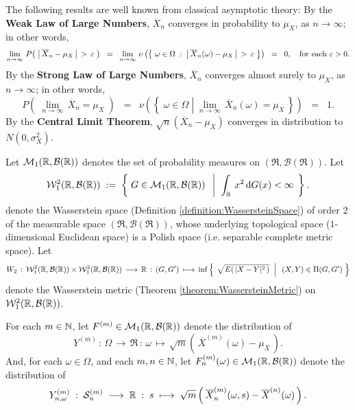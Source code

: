 \begin{remark}\quad
The following results are well known from classical asymptotic theory:
\vskip 0.1cm
\noindent
By the \textbf{Weak Law of Large Numbers}, $\overline{X}_{n}$ converges in probability to $\mu_{X}$,
as $n \longrightarrow \infty$; in other words,
\begin{equation*}
\lim_{n\rightarrow\infty}\,P\!\left(\;\left\vert\,\overline{X}_{n} - \mu_{X}\,\right\vert \,>\, \varepsilon\;\right)
\;\;=\;\;
\lim_{n\rightarrow\infty}\,\nu\left(\left\{\;\omega\in\Omega\;:\;\left\vert\,\overline{X}_{n}(\omega) - \mu_{X}\,\right\vert \,>\, \varepsilon\;\right\}\right)
\;\;=\;\; 0,
\quad\textnormal{for each $\varepsilon > 0$}.
\end{equation*}
By the \textbf{Strong Law of Large Numbers}, $\overline{X}_{n}$ converges almost surely to $\mu_{X}$,
as $n \longrightarrow \infty$; in other words,
\begin{equation*}
P\!\left(\;\lim_{n\rightarrow\infty}\,\overline{X}_{n} = \mu_{X}\;\right)
\;\;=\;\;
\nu\left(\left\{\;\omega\in\Omega \;\left\vert\; \lim_{n\rightarrow\infty}\,\overline{X}_{n}(\omega) = \mu_{X} \right. \,\right\}\right)
\;\;=\;\; 1.
\end{equation*}
By the \textbf{Central Limit Theorem}, $\sqrt{n}\left(\overline{X}_{n} - \mu_{X}\right)$ converges in distribution to $N(0,\sigma^{2}_{X})$.
\end{remark}

\proof
Let $\mathcal{M}_{1}(\mathbb{R},\mathcal{B}(\mathbb{R}))$ denotes the set of probability measures on $(\Re,\mathcal{B}(\Re))$.
Let
\begin{equation*}
\mathcal{W}^{2}_{1}\!\left(\mathbb{R},\mathcal{B}(\mathbb{R})\right)
\; := \;
\left\{\;
G \in \mathcal{M}_{1}(\mathbb{R},\mathcal{B}(\mathbb{R}))
\;\;\left\vert\;\;
\int_{\mathbb{R}}\,x^{2}\,\textnormal{d} G(x) < \infty
\right.
\;\right\}.
\end{equation*}
denote the Wasserstein space (Definition \ref{definition:WassersteinSpace}) of order $2$
of the measurable space $\left(\Re,\mathcal{B}(\Re)\right)$, whose underlying topological
space ($1$-dimensional Euclidean space) is a Polish space (i.e. separable complete metric space).
Let
\begin{equation*}
W_{2}
\,:\, \mathcal{W}^{2}_{1}\!\left(\mathbb{R},\mathcal{B}(\mathbb{R})\right) \times \mathcal{W}^{2}_{1}\!\left(\mathbb{R},\mathcal{B}(\mathbb{R})\right) \, \longrightarrow \, \mathbb{R}
\,:\, (G,G^{\prime}) \, \longmapsto \,
\inf\left\{\;
\left.
\sqrt{E\!\left(\,\vert X - Y \vert^{2}\,\right)}
\;\;\right\vert\;\;
(X,Y)\in \Pi(G,G^{\prime})
\;\right\}
\end{equation*}
denote the Wasserstein metric (Theorem \ref{theorem:WassersteinMetric}) on $\mathcal{W}^{2}_{1}\!\left(\mathbb{R},\mathcal{B}(\mathbb{R})\right)$.

\vskip 0.5cm
\noindent
For each $m \in \mathbb{N}$, let $F^{(m)} \in \mathcal{M}_{1}(\mathbb{R},\mathcal{B}(\mathbb{R}))$ denote the distribution of
\begin{equation*}
Y^{(m)}
\,:\, \Omega \,\longrightarrow\, \Re
\,:\, \omega \,\longmapsto\, \sqrt{m}\left(\,\overline{X}^{(m)}(\omega) - \mu_{X}\,\right).
\end{equation*}
And, for each $\omega \in \Omega$, and each $m, n \in \mathbb{N}$, let $F^{(m)}_{n}(\omega) \in \mathcal{M}_{1}(\mathbb{R},\mathcal{B}(\mathbb{R}))$ denote the distribution of
\begin{equation*}
Y^{(m)}_{n,\omega}
\;:\;
\mathcal{S}^{(m)}_{n}\;\longrightarrow\; \mathbb{R}
\;:\;
s
\;\longmapsto\;
\sqrt{m}\left(\,\overline{X}^{(m)}_{n}(\omega,s) - \overline{X}^{(n)}(\omega)\,\right).
\end{equation*}


